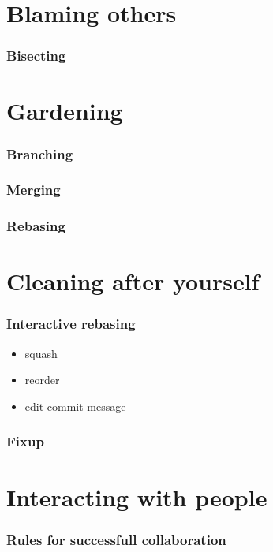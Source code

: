 \documentclass[
14pt,
aspectratio=169,
usenames,
dvipsnames,
x11names]{beamer}
\begin{document}
\section{Blaming others}

\begin{frame}
  \frametitle{Bisecting}

\end{frame}

\section{Gardening}

\begin{frame}
  \frametitle{Branching}

\end{frame}

\begin{frame}
  \frametitle{Merging}

\end{frame}

\begin{frame}
  \frametitle{Rebasing}

\end{frame}

\section{Cleaning after yourself}

\begin{frame}
  \frametitle{Interactive rebasing}
  \begin{itemize}
  \item squash
  \item reorder
  \item edit commit message
  \end{itemize}
\end{frame}

\begin{frame}
  \frametitle{Fixup}

\end{frame}

\section{Interacting with people}

\begin{frame}
  \frametitle{Rules for successfull collaboration}

\end{frame}
\end{document}
